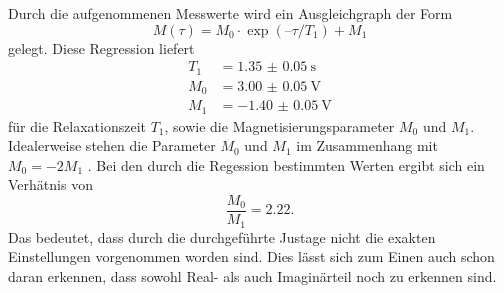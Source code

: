 Durch die aufgenommenen Messwerte wird ein Ausgleichgraph der Form
\begin{equation*}
  M(\tau) = M_0 \cdot \exp(–\tau/T_1) + M_1
\end{equation*}
gelegt. Diese Regression liefert
\begin{align*}
  T_1 &= \SI{1.35(005)}{\second} \\
  M_0 &= \SI{3.00(005)}{\volt} \\
  M_1 &= \SI{-1.40(005)}{\volt}
\end{align*} \noindent
für die Relaxationszeit $T_1$, sowie die Magnetisierungsparameter $M_0$ und $M_1$.
Idealerweise stehen die Parameter $M_0$ und $M_1$ im Zusammenhang mit $M_0 = -2M_1$ \cite{anleitung}. Bei den durch die Regession bestimmten
Werten ergibt sich ein Verhätnis von
\begin{equation*}
  \frac{M_0}{M_1} = 2.22.
\end{equation*}
Das bedeutet, dass durch die durchgeführte Justage nicht die exakten Einstellungen vorgenommen worden sind. Dies lässt
sich zum Einen auch schon daran erkennen, dass sowohl Real- als auch Imaginärteil noch zu erkennen sind.

